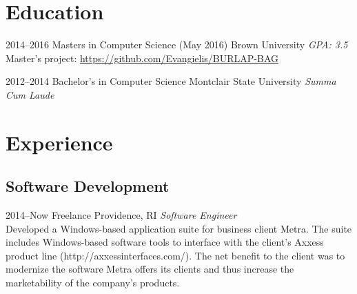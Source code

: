 \documentclass[]{friggeri-cv} %
\begin{document}
\section{Education}

\begin{entrylist}


\entry
{2014--2016}
{Masters {\normalfont in Computer Science (May 2016)}}
{Brown University}
{\emph{GPA: 3.5} \\ Master's project: \href{https://github.com/Evangielis/BURLAP-BAG}{https://github.com/Evangielis/BURLAP-BAG}}


\entry
{2012--2014}
{Bachelor's {\normalfont in Computer Science}}
{Montclair State University}
{\emph{Summa Cum Laude}}


\end{entrylist}


\section{Experience}

\subsection{Software Development}

\begin{entrylist}


\entry
{2014--Now}
{Freelance}
{Providence, RI}
{\emph{Software Engineer} \\
Developed a Windows-based application suite for business client Metra.  The suite includes Windows-based software tools to interface with the client's Axxess product line (http://axxessinterfaces.com/).  The net benefit to the client was to modernize the software Metra offers its clients and thus increase the marketability of the company's products. }


\end{entrylist}
\end{document}
